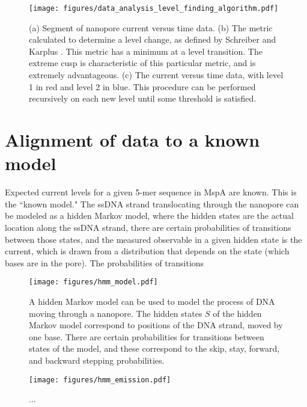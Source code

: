 \begin{figure}[H]
\begin{centering}
\texttt{[image: figures/data\_analysis\_level\_finding\_algorithm.pdf]}
\caption[Data analysis: level-finding algorithm]{(a) Segment of nanopore current versus time data.  (b) The metric calculated to determine a level change, as defined by Schreiber and Karplus \citep{Schreiber2015}.  This metric has a minimum at a level transition.  The extreme cusp is characteristic of this particular metric, and is extremely advantageous.  (c) The current versus time data, with level 1 in red and level 2 in blue.  This procedure can be performed recursively on each new level until some threshold is satisfied.}
\label{fig:data_analysis_level_alg}
\end{centering}
\end{figure}

\section{Alignment of data to a known model}
\label{level_alignment}

Expected current levels for a given 5-mer sequence in MspA are known.  This is the ``known model."  The ssDNA strand translocating through the nanopore can be modeled as a hidden Markov model, where the hidden states are the actual location along the ssDNA strand, there are certain probabilities of transitions between those states, and the measured observable in a given hidden state is the current, which is drawn from a distribution that depends on the state (which bases are in the pore).  The probabilities of transitions 

\begin{figure}[h]
\begin{centering}
\texttt{[image: figures/hmm\_model.pdf]}
\caption[Data analysis: hidden Markov model]{A hidden Markov model can be used to model the process of DNA moving through a nanopore.  The hidden states $S$ of the hidden Markov model correspond to positions of the DNA strand, moved by one base.  There are certain probabilities for transitions between states of the model, and these correspond to the skip, stay, forward, and backward stepping probabilities.}
\label{fig:data_analysis_hmm}
\end{centering}
\end{figure}

\begin{figure}[h]
\begin{centering}
\texttt{[image: figures/hmm\_emission.pdf]}
\caption[Data analysis: hidden Markov model emission probability]{...}
\label{fig:data_analysis_emission}
\end{centering}
\end{figure}

